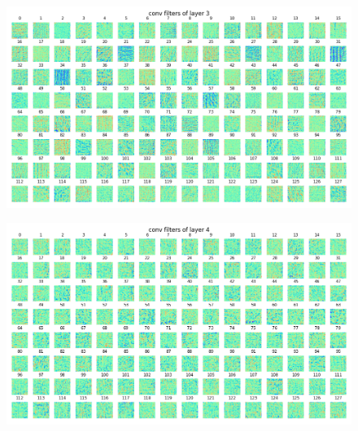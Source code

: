 \documentclass[a4paper]{article}
\begin{document}
\begin{enumerate}
\begin{enumerate}
\begin{figure}[H]
            \includegraphics[width=0.65\linewidth]{../result/4_filter_layer3.png}
            \caption{}
        \end{figure}
        \begin{figure}[H]
            \centering
            \includegraphics[width=0.65\linewidth]{../result/4_filter_layer4.png}
            \caption{}
        \end{figure}


\end{enumerate}
\end{enumerate}
\end{document}
